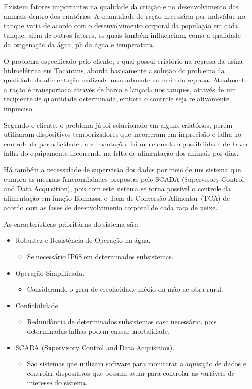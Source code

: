 Existem fatores importantes na qualidade da criação e no desenvolvimento dos animais dentro dos criatórios. A quantidade de ração necessária por indivíduo no tanque varia de acordo com o desenvolvimento corporal da população em cada tanque, além de outros fatores, os quais também influenciam,  como a qualidade da oxigenação da água, ph da água e temperatura.

O problema especificado pelo cliente, o qual possui criatório na represa da usina hidroelétrica em Tocantins, aborda basicamente a solução do problema da qualidade da alimentação realizada manualmente no meio da represa. Atualmente a ração é transportada através de barco e lançada nos tanques, através de um recipiente de quantidade determinada, embora o controle seja relativamente impreciso.

Segundo o cliente, o problema já foi solucionado em alguns criatórios, porém utilizaram dispositivos temporizadores que incorreram em imprecisão e falha no controle da periodicidade da alimentação; foi mencionado a possibilidade de haver falha do equipamento incorrendo na falta de alimentação dos animais por dias.

Há também a necessidade  de supervisão dos dados por meio de um sistema que cumpra as mesmas funcionalidades propostas pelo SCADA (Supervisory Control and Data Acquisition), pois com este sistema se torna possível o controle da alimentação em função Biomassa e Taxa de Conversão Alimentar (TCA) de acordo com as fases de desenvolvimento corporal de cada raça de peixe.

As características prioritárias do sistema são:
\begin{itemize}
  \item Robustez e Resistência de Operação na água.
    \begin{itemize}
      \item Se necessário IP68 em determinados subsistemas.
    \end{itemize}
  \item Operação Simplificada.
    \begin{itemize}
      \item Considerando o grau de escolaridade médio da mão de obra rural.
    \end{itemize}
  \item Confiabilidade.
    \begin{itemize}
      \item Redundância de determinados subsistemas caso necessário, pois determinadas falhas podem causar mortalidade.
    \end{itemize}
  \item SCADA (Supervisory Control and Data Acquisition).
   \begin{itemize}
     \item São sistemas que utilizam software para monitorar a aquisição de dados e controlar dispositivos que possam atuar para controlar as variáveis de interesse do sistema.
   \end{itemize}
\end{itemize}

